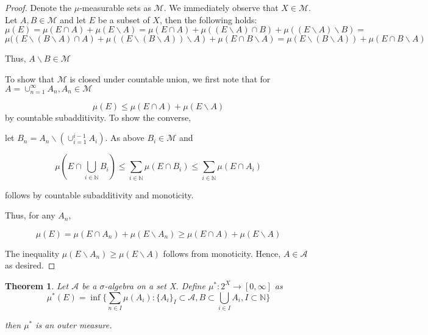 \documentclass[12pt]{article}
\newtheorem{theorem}{Theorem}[section]
\theoremstyle{remark}
\begin{document}
\begin{proof}
Denote the $\mu$-measurable sets as $\mathcal{M}$. We immediately observe that $X \in \mathcal{M}$. Let $A,B \in \mathcal{M}$ and let $E$ be a subset of $X$, then the following holds:
$$ \mu(E) =  \mu(E \cap A) + \mu(E\backslash A) =  \mu(E \cap A) + \mu((E \backslash A) \cap B) + \mu((E \backslash A) \backslash B) =$$
$$ \mu((E\backslash (B \backslash A) \cap A) + \mu((E \backslash (B \backslash A)) \backslash A) + \mu(E \cap B \backslash A) = \mu(E \backslash (B \backslash A)) + \mu(E \cap B \backslash A)$$


Thus, $A \backslash B \in \mathcal{M}$

To show that $\mathcal{M}$ is closed under countable union, we first note that for $A = \cup_{n =1}^{\infty} A_n, A_n \in \mathcal{M}$

$$\mu(E) \leq \mu(E \cap A) + \mu(E \backslash A)$$
by countable subadditivity. To show the converse,

let $B_n = A_n \backslash (\cup_{i=1}^{i-1} A_i)$. As above $B_i \in \mathcal{M}$ and

$$ \mu(E \cap \bigcup_{i \in \mathbb{N}} B_i) \leq \sum_{i \in \mathbb{N}} \mu(E \cap B_i) \leq \sum_{i \in \mathbb{N}} \mu(E \cap A_i)   $$

follows by countable subadditivity and monoticity.

Thus, for any $A_n$,

$$\mu(E) = \mu(E \cap A_n) + \mu(E \backslash A_n) \geq \mu(E \cap A) + \mu(E \backslash A) $$

The inequality $\mu(E\backslash A_n) \geq \mu(E \backslash A)$ follows from monoticity.
Hence, $A \in \mathcal{A}$ as desired.

\end{proof}

\begin{theorem} Let $\mathcal{A}$ be a $\sigma$-algebra on a set X. Define $\mu^*: 2^X \rightarrow [0,\infty]$ as
$$ \mu^*(E) = \inf\{\sum_{n \in I} \mu(A_i)  : \{{A_i}\}_{I} \subset \mathcal{A}, B \subset \bigcup_{i \in I} A_i, I \subset \mathbb{N} \}$$ 

then $\mu^*$ is an outer measure.

\end{theorem}
\end{document}
